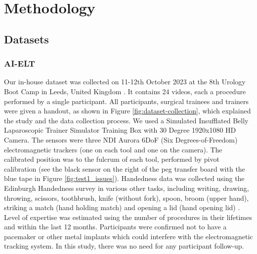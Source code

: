 \section{Methodology}

\subsection{Datasets}

\subsubsection{AI-ELT}

Our in-house dataset was collected on 11-12th October 2023 at the 8th Urology Boot Camp in Leeds, United Kingdom \cite{urology2023}. It contains 24 videos, each a procedure performed by a single participant. All participants, surgical trainees and trainers were given a handout, as shown in Figure \ref{fig:dataset-collection}, which explained the study and the data collection process. We used a Simulated Insufflated Belly Laparoscopic Trainer Simulator Training Box with 30 Degree 1920x1080 HD Camera. The sensors were three NDI Aurora 6DoF (Six Degrees-of-Freedom) electromagnetic trackers (one on each tool and one on the camera). The calibrated position was to the fulcrum of each tool, performed by pivot calibration (see the black sensor on the right of the peg transfer board with the blue tape in Figure \ref{fig:test1_issues}). Handedness data was collected using the Edinburgh Handedness survey in various other tasks, including writing, drawing, throwing, scissors, toothbrush, knife (without fork), spoon, broom (upper hand), striking a match (hand holding match) and opening a lid (hand opening lid) \cite{oldfield_assessment_1971}. Level of expertise was estimated using the number of procedures in their lifetimes and within the last 12 months. Participants were confirmed not to have a pacemaker or other metal implants which could interfere with the electromagnetic tracking system. In this study, there was no need for any participant follow-up.


